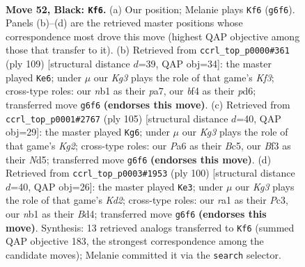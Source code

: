 \documentclass[11pt]{article}
\begin{document}
\clearpage

\begin{figure}[p]\centering
\begin{subfigure}{0.46\textwidth}\centering
\resizebox{\linewidth}{!}{%
\newchessgame
\chessboard[
  setfen={6K1/n1P5/p5k1/P4p1p/4pB2/5bP1/8/RN1r4 b - - 11 52},
  showmover=false,
  pgfstyle=straightmove, color=movearrow, markmove={g6-f6}
]}
\caption{}
\end{subfigure}\hfill
\begin{subfigure}{0.46\textwidth}\centering
\resizebox{\linewidth}{!}{%
\newchessgame
\chessboard[
  setfen={r7/P2p4/2bP1k2/4p1p1/6Pp/3KB2P/R7/8 b - - 1 55},
  showmover=false,
  pgfstyle=straightmove, color=movearrow, markmove={f6-e6}
]}
\caption{}
\end{subfigure}
\\[4pt]
\begin{subfigure}{0.46\textwidth}\centering
\resizebox{\linewidth}{!}{%
\newchessgame
\chessboard[
  setfen={8/5pk1/1r2p2p/1Nbn4/5P1P/1R4P1/4B1K1/8 b - - 12 53},
  showmover=false,
  pgfstyle=straightmove, color=movearrow, markmove={g7-g6}
]}
\caption{}
\end{subfigure}\hfill
\begin{subfigure}{0.46\textwidth}\centering
\resizebox{\linewidth}{!}{%
\newchessgame
\chessboard[
  setfen={6R1/1p2k3/2b5/3r2p1/2pBp1P1/P1P5/2PK1P2/8 w - - 16 51},
  showmover=false,
  pgfstyle=straightmove, color=movearrow, markmove={d2-e3}
]}
\caption{}
\end{subfigure}
\caption{\textbf{Move 52, Black: \texttt{Kf6}.} (a) Our position; Melanie plays \texttt{Kf6} (\texttt{g6f6}). Panels (b)--(d) are the retrieved master positions whose correspondence most drove this move (highest QAP objective among those that transfer to it). (b) Retrieved from \texttt{ccrl\_top\_p0000\#361} (ply 109) [structural distance $d$=39, QAP obj=34]: the master played \texttt{Ke6}; under $\mu$ our \emph{Kg3} plays the role of that game's \emph{Kf3}; cross-type roles: our \emph{n}b1 as their \emph{p}a7, our \emph{b}f4 as their \emph{p}d6; transferred move \texttt{g6f6} \textbf{(endorses this move)}. (c) Retrieved from \texttt{ccrl\_top\_p0001\#2767} (ply 105) [structural distance $d$=40, QAP obj=29]: the master played \texttt{Kg6}; under $\mu$ our \emph{Kg3} plays the role of that game's \emph{Kg2}; cross-type roles: our \emph{P}a6 as their \emph{B}c5, our \emph{B}f3 as their \emph{N}d5; transferred move \texttt{g6f6} \textbf{(endorses this move)}. (d) Retrieved from \texttt{ccrl\_top\_p0003\#1953} (ply 100) [structural distance $d$=40, QAP obj=26]: the master played \texttt{Ke3}; under $\mu$ our \emph{Kg3} plays the role of that game's \emph{Kd2}; cross-type roles: our \emph{r}a1 as their \emph{P}c3, our \emph{n}b1 as their \emph{B}d4; transferred move \texttt{g6f6} \textbf{(endorses this move)}. Synthesis: 13 retrieved analogs transferred to \texttt{Kf6} (summed QAP objective 183, the strongest correspondence among the candidate moves); Melanie committed it via the \texttt{search} selector.}
\label{fig:thought-m103}
\end{figure}
\end{document}
